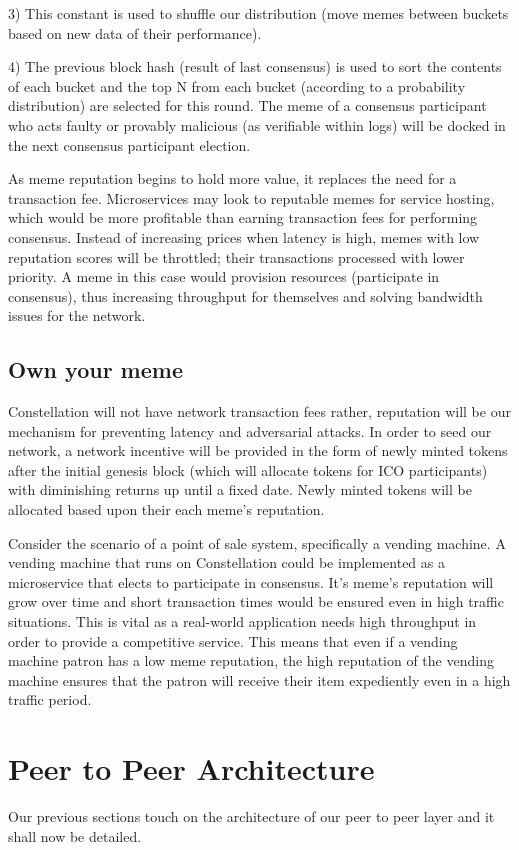 \documentclass{article}
\begin{document}
3)	This constant is used to shuffle our distribution (move memes between buckets based on new data of their performance).

4)	The previous block hash (result of last consensus) is used to sort the contents of each bucket and the top N from each bucket (according to a probability distribution) are selected for this round. The meme of a consensus participant who acts faulty or provably malicious (as verifiable within logs) will be docked in the next consensus participant election.

As meme reputation begins to hold more value, it replaces the need for a transaction fee. Microservices may look to reputable memes for service hosting, which would be more profitable than earning transaction fees for performing consensus. Instead of increasing prices when latency is high, memes with low reputation scores will be throttled; their transactions processed with lower priority. A meme in this case would provision resources (participate in consensus), thus increasing throughput for themselves and solving bandwidth issues for the network.

 \subsection{Own your meme}
Constellation will not have network transaction fees rather, reputation will be our mechanism for preventing latency and adversarial attacks. In order to seed our network, a network incentive will be provided in the form of newly minted tokens after the initial genesis block (which will allocate tokens for ICO participants) with diminishing returns up until a fixed date. Newly minted tokens will be allocated based upon their each meme's reputation.

Consider the scenario of a point of sale system, specifically a vending machine. A vending machine that runs on Constellation could be implemented as a microservice that elects to participate in consensus. It's meme's reputation will grow over time and short transaction times would be ensured even in high traffic situations. This is vital as a real-world application needs high throughput in order to provide a competitive service. This means that even if a vending machine patron has a low meme reputation, the high reputation of the vending machine ensures that the patron will receive their item expediently even in a high traffic period. 

\section{Peer to Peer Architecture}
Our previous sections touch on the architecture of our peer to peer layer and it shall now be detailed. 
\end{document}
